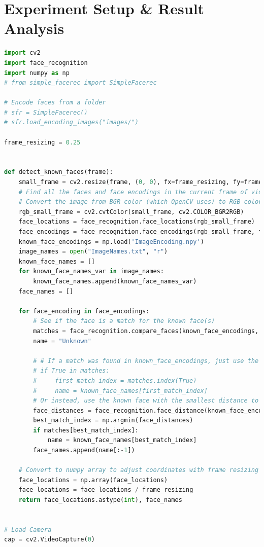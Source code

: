 \documentclass[14.49pt, a4paper, one side, margin = 2in]{article}
\begin{document}
\section{Experiment Setup \& Result Analysis}
\begin{lstlisting}[breaklines, language=Python]
import cv2
import face_recognition
import numpy as np
# from simple_facerec import SimpleFacerec

# Encode faces from a folder
# sfr = SimpleFacerec()
# sfr.load_encoding_images("images/")

frame_resizing = 0.25


def detect_known_faces(frame):
    small_frame = cv2.resize(frame, (0, 0), fx=frame_resizing, fy=frame_resizing)
    # Find all the faces and face encodings in the current frame of video
    # Convert the image from BGR color (which OpenCV uses) to RGB color (which face_recognition uses)
    rgb_small_frame = cv2.cvtColor(small_frame, cv2.COLOR_BGR2RGB)
    face_locations = face_recognition.face_locations(rgb_small_frame)
    face_encodings = face_recognition.face_encodings(rgb_small_frame, face_locations)
    known_face_encodings = np.load('ImageEncoding.npy')
    image_names = open("ImageNames.txt", "r")
    known_face_names = []
    for known_face_names_var in image_names:
        known_face_names.append(known_face_names_var)
    face_names = []

    for face_encoding in face_encodings:
        # See if the face is a match for the known face(s)
        matches = face_recognition.compare_faces(known_face_encodings, face_encoding)
        name = "Unknown"

        # # If a match was found in known_face_encodings, just use the first one.
        # if True in matches:
        #     first_match_index = matches.index(True)
        #     name = known_face_names[first_match_index]
        # Or instead, use the known face with the smallest distance to the new face
        face_distances = face_recognition.face_distance(known_face_encodings, face_encoding)
        best_match_index = np.argmin(face_distances)
        if matches[best_match_index]:
            name = known_face_names[best_match_index]
        face_names.append(name[:-1])

    # Convert to numpy array to adjust coordinates with frame resizing quickly
    face_locations = np.array(face_locations)
    face_locations = face_locations / frame_resizing
    return face_locations.astype(int), face_names


# Load Camera
cap = cv2.VideoCapture(0)



\end{lstlisting}
\end{document}
